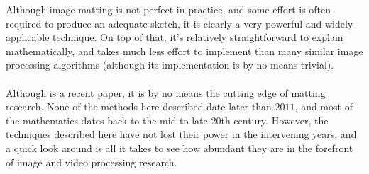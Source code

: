 Although image matting is not perfect in practice, and some effort is often required to produce an adequate sketch, it is clearly a very powerful and widely applicable technique. On top of that, it's relatively straightforward to explain mathematically, and takes much less effort to implement than many similar image processing algorithms (although its implementation is by no means trivial).
\\\\
Although \cite{lee14} is a recent paper, it is by no means the cutting edge of matting research. None of the methods here described date later than $2011$, and most of the mathematics dates back to the mid to late 20th century. However, the techniques described here have not lost their power in the intervening years, and a quick look around is all it takes to see how abundant they are in the forefront of image and video processing research.